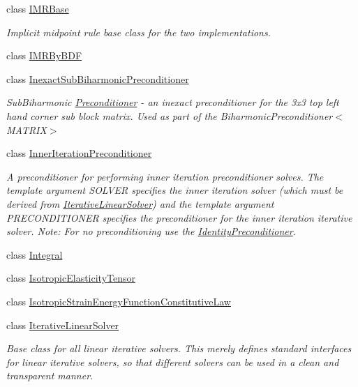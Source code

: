 \begin{DoxyCompactItemize}
\item 
class \hyperlink{classoomph_1_1IMRBase}{I\+M\+R\+Base}
\begin{DoxyCompactList}\small\item\em Implicit midpoint rule base class for the two implementations. \end{DoxyCompactList}\item 
class \hyperlink{classoomph_1_1IMRByBDF}{I\+M\+R\+By\+B\+DF}
\item 
class \hyperlink{classoomph_1_1InexactSubBiharmonicPreconditioner}{Inexact\+Sub\+Biharmonic\+Preconditioner}
\begin{DoxyCompactList}\small\item\em Sub\+Biharmonic \hyperlink{classoomph_1_1Preconditioner}{Preconditioner} -\/ an inexact preconditioner for the 3x3 top left hand corner sub block matrix. Used as part of the Biharmonic\+Preconditioner$<$\+M\+A\+T\+R\+I\+X$>$ \end{DoxyCompactList}\item 
class \hyperlink{classoomph_1_1InnerIterationPreconditioner}{Inner\+Iteration\+Preconditioner}
\begin{DoxyCompactList}\small\item\em A preconditioner for performing inner iteration preconditioner solves. The template argument S\+O\+L\+V\+ER specifies the inner iteration solver (which must be derived from \hyperlink{classoomph_1_1IterativeLinearSolver}{Iterative\+Linear\+Solver}) and the template argument P\+R\+E\+C\+O\+N\+D\+I\+T\+I\+O\+N\+ER specifies the preconditioner for the inner iteration iterative solver. Note\+: For no preconditioning use the \hyperlink{classoomph_1_1IdentityPreconditioner}{Identity\+Preconditioner}. \end{DoxyCompactList}\item 
class \hyperlink{classoomph_1_1Integral}{Integral}
\item 
class \hyperlink{classoomph_1_1IsotropicElasticityTensor}{Isotropic\+Elasticity\+Tensor}
\item 
class \hyperlink{classoomph_1_1IsotropicStrainEnergyFunctionConstitutiveLaw}{Isotropic\+Strain\+Energy\+Function\+Constitutive\+Law}
\item 
class \hyperlink{classoomph_1_1IterativeLinearSolver}{Iterative\+Linear\+Solver}
\begin{DoxyCompactList}\small\item\em Base class for all linear iterative solvers. This merely defines standard interfaces for linear iterative solvers, so that different solvers can be used in a clean and transparent manner. \end{DoxyCompactList}\item 

\end{DoxyCompactItemize}

